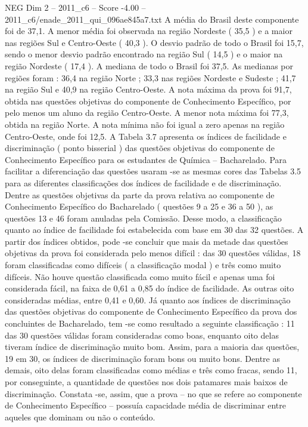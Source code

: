 \begin{textsample}{NEG Dim 2 – 2011\_c6 – Score -4.00 – 2011\_c6/enade\_2011\_qui\_096ae845a7.txt}
A média do Brasil deste componente foi de 37,1.
A menor média foi observada na região Nordeste ( 35,5 ) e a maior nas regiões Sul e Centro-Oeste ( 40,3 ).
O desvio padrão de todo o Brasil foi 15,7, sendo o menor desvio padrão encontrado na região Sul ( 14,5 ) e o maior na região Nordeste ( 17,4 ).
A mediana de todo o Brasil foi 37,5.
As medianas por regiões foram : 36,4 na região Norte ; 33,3 nas regiões Nordeste e Sudeste ; 41,7 na região Sul e 40,9 na região Centro-Oeste.
A nota máxima da prova foi 91,7, obtida nas questões objetivas do componente de Conhecimento Específico, por pelo menos um aluno da região Centro-Oeste.
A menor nota máxima foi 77,3, obtida na região Norte.
A nota mínima não foi igual a zero apenas na região Centro-Oeste, onde foi 12,5.
A Tabela 3.7 apresenta os índices de facilidade e discriminação ( ponto bisserial ) das questões objetivas do componente de Conhecimento Específico para os estudantes de Química – Bacharelado.
Para facilitar a diferenciação das questões usaram -se as mesmas cores das Tabelas 3.5 para as diferentes classificações dos índices de facilidade e de discriminação.
Dentre as questões objetivas da parte da prova relativa ao componente de Conhecimento Específico do Bacharelado ( questões 9 a 25 e 36 a 50 ), as questões 13 e 46 foram anuladas pela Comissão.
Desse modo, a classificação quanto ao índice de facilidade foi estabelecida com base em 30 das 32 questões.
A partir dos índices obtidos, pode -se concluir que mais da metade das questões objetivas da prova foi considerada pelo menos difícil : das 30 questões válidas, 18 foram classificadas como difíceis ( a classificação modal ) e três como muito difíceis.
Não houve questão classificada como muito fácil e apenas uma foi considerada fácil, na faixa de 0,61 a 0,85 do índice de facilidade.
As outras oito consideradas médias, entre 0,41 e 0,60.
Já quanto aos índices de discriminação das questões objetivas do componente de Conhecimento Específico da prova dos concluintes de Bacharelado, tem -se como resultado a seguinte classificação : 11 das 30 questões válidas foram consideradas como boas, enquanto oito delas tiveram índice de discriminação muito bom.
Assim, para a maioria das questões, 19 em 30, os índices de discriminação foram bons ou muito bons.
Dentre as demais, oito delas foram classificadas como médias e três como fracas, sendo 11, por conseguinte, a quantidade de questões nos dois patamares mais baixos de discriminação.
Constata -se, assim, que a prova – no que se refere ao componente de Conhecimento Específico – possuía capacidade média de discriminar entre aqueles que dominam ou não o conteúdo.

\end{textsample}

